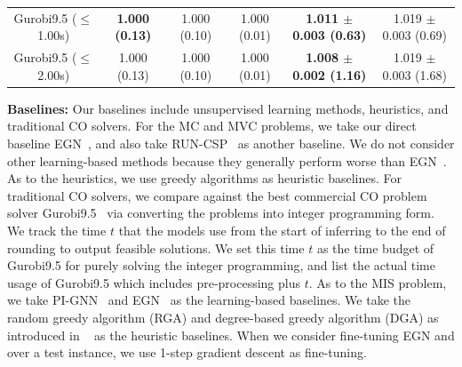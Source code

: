 \begin{table}[t]
\begin{minipage}{1.00 \linewidth}
{\begin{tabular}{@{}cccccc@{}}
Gurobi9.5 ($\leq$1.00s) & \textbf{1.000 (0.13)} &  1.000 (0.10)   &   1.000 (0.01)   &    \textbf{1.011 \hspace{-0.3mm}$\pm$\hspace{-0.3mm} 0.003 (0.63)}    &   1.019 \hspace{-0.3mm}$\pm$\hspace{-0.3mm} 0.003 (0.69)     \\
Gurobi9.5 ($\leq$2.00s) & 1.000 (0.13) &  1.000 (0.10)   &   1.000 (0.01)   &   \textbf{1.008 \hspace{-0.3mm}$\pm$\hspace{-0.3mm} 0.002 (1.16)}     &    1.019 \hspace{-0.3mm}$\pm$\hspace{-0.3mm} 0.003 (1.68)    \\ \bottomrule
\end{tabular}}
    
     
   \end{minipage}
 \vspace{-4mm}
\end{table}

\textbf{Baselines:} Our baselines include unsupervised learning methods, heuristics, and traditional CO solvers. 
For the MC and MVC problems, we take our direct baseline EGN~\citep{karalias2020erdos}, and also take RUN-CSP~\citep{toenshoff2021graph} as another baseline. %
We do not consider other learning-based methods because they generally perform worse than EGN~\citep{karalias2020erdos}. %
As to the heuristics, we use greedy algorithms as heuristic baselines. For traditional CO solvers, we compare against the best commercial CO problem solver Gurobi9.5~\citep{Gurobi} via converting the problems into integer programming form. We track the time $t$ that the models use from the start of inferring to the end of rounding to output feasible solutions. We set this time $t$ as the time budget of Gurobi9.5 for purely solving the integer programming, and list the actual time usage of Gurobi9.5 which includes pre-processing plus $t$.
As to the MIS problem, we take PI-GNN~\citep{schuetz2022combinatorial} and EGN~\cite{karalias2020erdos} as the learning-based baselines. We take the random greedy algorithm (RGA) and degree-based greedy algorithm (DGA) as introduced in ~\cite{angelini2019monte} as the heuristic baselines. When we consider fine-tuning EGN and \proj over a test instance, we use 1-step gradient descent as fine-tuning.

